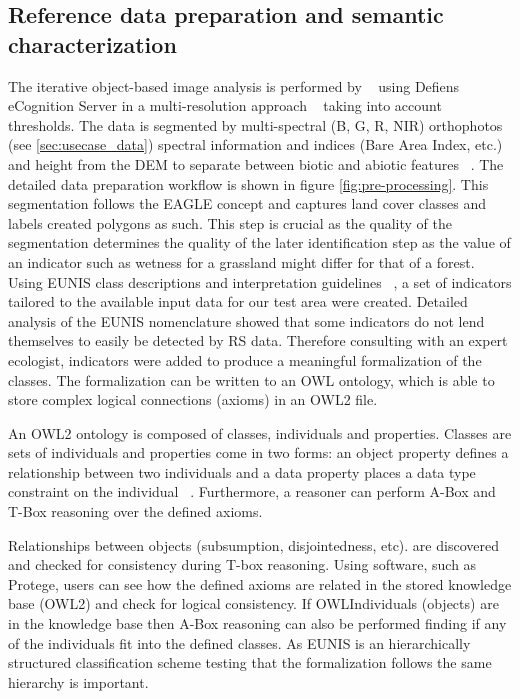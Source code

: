 \documentclass[authoryear,preprint,12pt,number]{elsarticle}
\begin{document}
\subsection{Reference data preparation and semantic characterization}
The iterative object-based image analysis is performed by ~\cite{Tintrup2015} 
using Defiens eCognition Server in a multi-resolution approach 
~\citep{baatz2001ecognition} taking into account thresholds. The data is 
segmented by multi-spectral (B, G, R, NIR) orthophotos (see 
\ref{sec:usecase_data}) spectral information and indices (Bare Area Index, 
etc.) and height from the DEM to separate between biotic and abiotic features 
~\citep{Tintrup2015}. The detailed data preparation workflow is shown in figure 
\ref{fig:pre-processing}. This segmentation follows the EAGLE concept and
captures land cover classes and labels created polygons as such. This step is
crucial as the quality of the segmentation determines the quality of the later
identification step as the value of an indicator such as wetness for a grassland
might differ for that of a forest. Using EUNIS class descriptions and
interpretation guidelines ~\citep{EUNISManual}, a set of indicators tailored to
the available input data for our test area were created. Detailed analysis of
the EUNIS nomenclature showed that some indicators do not lend themselves to
easily be detected by RS data. Therefore consulting with an expert ecologist,
indicators were added to produce a meaningful formalization of the classes. The
formalization can be written to an OWL ontology, which is able to store complex
logical connections (axioms) in an OWL2 file.

An OWL2 ontology is composed of classes, individuals and properties. Classes are
sets of individuals and properties come in two forms: an object property defines
a relationship between two individuals and a data property  places a data type
constraint on the individual ~\citep{OWL2}. Furthermore, a reasoner can perform
A-Box and T-Box reasoning over the defined axioms. 

Relationships between objects (subsumption, disjointedness, etc). are discovered
and checked for consistency during T-box reasoning. Using software, such as
Protege, users can see how the defined axioms are related in the stored
knowledge base (OWL2) and check for logical consistency. If OWLIndividuals
(objects) are in the knowledge base then A-Box reasoning can also be performed
finding if any of the individuals fit into the defined classes. As EUNIS is an
hierarchically structured classification scheme testing that the formalization
follows the same hierarchy is important. 
\end{document}
